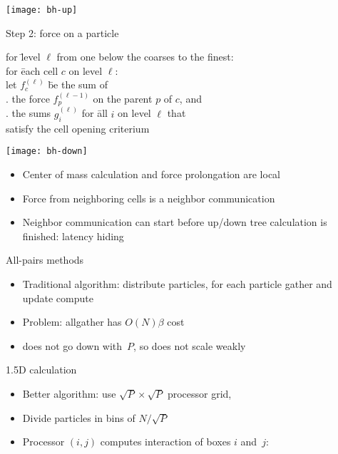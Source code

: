 \begin{frame}
  \texttt{[image: bh-up]}
\end{frame}

\begin{frame}{Step 2: force on a particle}
  \begin{tabbing}
    for \=level $\ell$ from one below the coarses to the finest:\\
    \>for \=each cell $c$ on level $\ell$:\\
    \>\>let $f^{(\ell)}_c$ \=be the sum of\\
    \>\>. the force $f^{(\ell-1)}_p$ on the parent $p$ of $c$, and\\
    \>\>. the sums $g^{(\ell)}_i$ for \=all $i$ on level $\ell$ that\\
    \>\>\>\>satisfy the cell opening criterium
  \end{tabbing}
\end{frame}

\begin{frame}
  \texttt{[image: bh-down]}
\end{frame}

\begin{frame}
  \begin{itemize}
  \item Center of mass calculation and force prolongation are local
  \item Force from neighboring cells is a neighbor communication
  \item Neighbor communication can start before up/down tree
    calculation is finished: latency hiding
  \end{itemize}
\end{frame}

\begin{frame}{All-pairs methods}
  \begin{itemize}
  \item Traditional algorithm: distribute particles,
    for each particle gather and update compute
  \item Problem: allgather has $O(N)\beta$ cost
  \item does not go down with~$P$, so does not scale weakly
  \end{itemize}
\end{frame}

\begin{frame}{1.5D calculation}
  \begin{itemize}
  \item Better algorithm: use $\sqrt P\times\sqrt P$ processor grid,
  \item Divide particles in bins of $N/\sqrt P$
  \item Processor $(i,j)$ computes interaction of boxes $i$ and~$j$:
  \end{itemize}
\end{frame}

